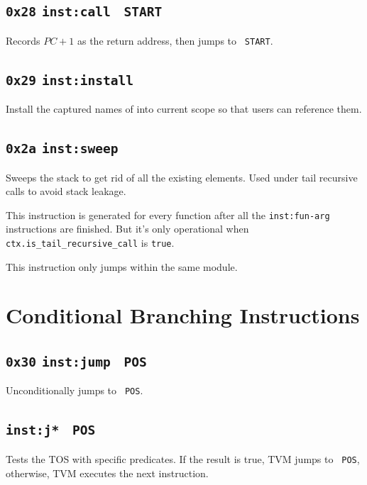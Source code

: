 \documentclass{report}
\newcommand{\mtilde}[1]{\textasciitilde}
\newcommand{\marg}[1]{\texttt{\mtilde ~#1}}
\newcommand{\inst}[1] {\texttt{inst:#1}}
\begin{document}
\subsection{\texttt{0x28} \inst{call} \marg{START}}

Records $PC + 1$ as the return address, then jumps to \marg{START}.

\subsection{\texttt{0x29} \inst{install} }

Install the captured names of  into current scope so that users can reference them.

\subsection{\texttt{0x2a} \inst{sweep}}

Sweeps the stack to get rid of all the existing elements. Used under tail recursive calls to avoid stack leakage.

\begin{mdframed}[style=hint]
  This instruction is generated for every function after all the \inst{fun-arg} instructions are finished. But it's only operational when \texttt{ctx.is\_tail\_recursive\_call} is \texttt{true}.
\end{mdframed}

\begin{mdframed}[style=hint]
  This instruction only jumps within the same module.
\end{mdframed}

\section{Conditional Branching Instructions}

\subsection{\texttt{0x30} \inst{jump} \marg{POS}}

Unconditionally jumps to \marg{POS}.

\subsection{\inst{j*} \marg{POS} }

Tests the TOS with specific predicates. If the result is true, TVM jumps to \marg{POS}, otherwise, TVM executes the next instruction.
\end{document}
